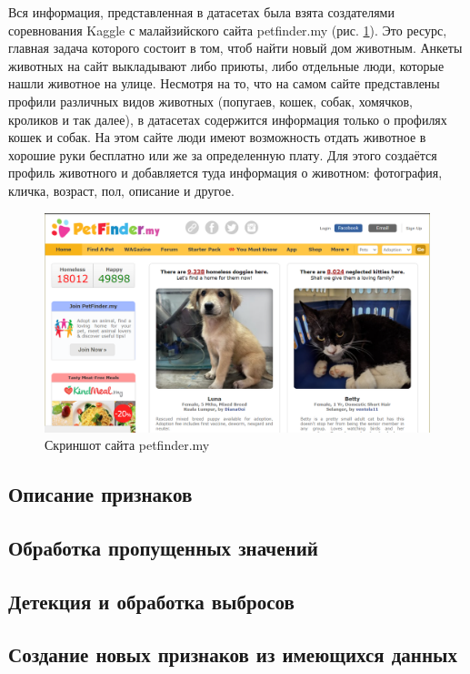 \documentclass[14pt]{mmcs_article}
\begin{document}
Вся информация, представленная в датасетах была взята создателями соревнования Kaggle с малайзийского сайта petfinder.my (рис. \ref{analyse:fig:1}). Это ресурс, главная задача которого состоит в том, чтоб найти новый дом животным. Анкеты животных на сайт выкладывают либо приюты, либо отдельные люди, которые нашли животное на улице. Несмотря на то, что на самом сайте представлены профили различных видов животных (попугаев, кошек, собак, хомячков, кроликов и так далее), в датасетах содержится информация только о профилях кошек и собак. На этом сайте люди имеют возможность отдать животное в хорошие руки бесплатно или же за определенную плату. Для этого создаётся профиль животного и добавляется туда информация о животном: фотография, кличка, возраст, пол, описание и другое.

\begin{figure}[H]
	\centering
	\includegraphics[scale=0.4]{petfinder}
	\caption{Скриншот сайта petfinder.my}\label{analyse:fig:1}
\end{figure}



\subsection{Описание признаков}

\subsection{Обработка пропущенных значений}

\subsection{Детекция и обработка выбросов}

\subsection{Создание новых признаков из имеющихся данных}
\end{document}

